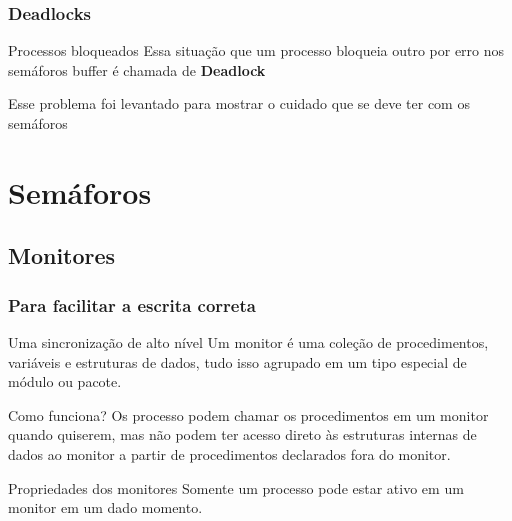 \documentclass[11pt]{beamer}
\begin{document}
\begin{frame}\frametitle{ Deadlocks}

\begin{block}{ Processos bloqueados}
  Essa situação que um processo bloqueia outro por erro nos semáforos buffer é chamada de \textbf{Deadlock}
\end{block}

\pause
\begin{alertblock}{ }
	Esse problema foi levantado para mostrar o cuidado que se deve ter com os semáforos
\end{alertblock}


\end{frame}


\section{ Semáforos}
\subsection*{ Monitores}
\begin{frame}\frametitle{ Para facilitar a escrita correta}

\begin{block}{ Uma sincronização de alto nível }
  Um monitor é uma coleção de procedimentos, variáveis e estruturas de dados, tudo isso agrupado em um tipo especial de módulo ou pacote.
\end{block}

\pause
\begin{exampleblock}{ Como funciona?}
	Os processo podem chamar os procedimentos em um monitor quando quiserem, mas não podem ter acesso direto às estruturas internas de dados ao monitor a partir de procedimentos declarados fora do monitor.
\end{exampleblock}

\pause
\begin{alertblock}{ Propriedades dos monitores}
	Somente um processo pode estar ativo em um monitor em um dado momento.
\end{alertblock}

\end{frame}


\end{document}

